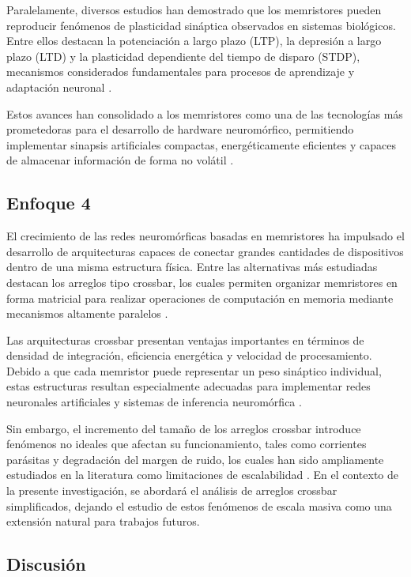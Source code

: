 Paralelamente, diversos estudios han demostrado que los memristores pueden reproducir fenómenos de plasticidad sináptica observados en sistemas biológicos. Entre ellos destacan la potenciación a largo plazo (LTP), la depresión a largo plazo (LTD) y la plasticidad dependiente del tiempo de disparo (STDP), mecanismos considerados fundamentales para procesos de aprendizaje y adaptación neuronal \cite{2}.

Estos avances han consolidado a los memristores como una de las tecnologías más prometedoras para el desarrollo de hardware neuromórfico, permitiendo implementar sinapsis artificiales compactas, energéticamente eficientes y capaces de almacenar información de forma no volátil \cite{6}.

\subsection{Enfoque 4}

El crecimiento de las redes neuromórficas basadas en memristores ha impulsado el desarrollo de arquitecturas capaces de conectar grandes cantidades de dispositivos dentro de una misma estructura física. Entre las alternativas más estudiadas destacan los arreglos tipo crossbar, los cuales permiten organizar memristores en forma matricial para realizar operaciones de computación en memoria mediante mecanismos altamente paralelos \cite{4,5}.

Las arquitecturas crossbar presentan ventajas importantes en términos de densidad de integración, eficiencia energética y velocidad de procesamiento. Debido a que cada memristor puede representar un peso sináptico individual, estas estructuras resultan especialmente adecuadas para implementar redes neuronales artificiales y sistemas de inferencia neuromórfica \cite{5}.

Sin embargo, el incremento del tamaño de los arreglos crossbar introduce fenómenos no ideales que afectan su funcionamiento, tales como corrientes parásitas y degradación del margen de ruido, los cuales han sido ampliamente estudiados en la literatura como limitaciones de escalabilidad \cite{7}. En el contexto de la presente investigación, se abordará el análisis de arreglos crossbar simplificados, dejando el estudio de estos fenómenos de escala masiva como una extensión natural para trabajos futuros.

\subsection{Discusión}

